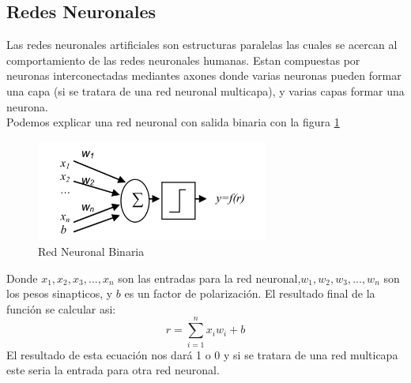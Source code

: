 \documentclass[conference]{IEEEtran}
\begin{document}
 \subsection{Redes Neuronales}
 Las redes neuronales artificiales son estructuras paralelas las cuales se acercan al comportamiento de las redes neuronales humanas. Estan compuestas por neuronas  interconectadas mediantes axones donde varias neuronas pueden formar una capa (si se tratara de una red neuronal multicapa), y varias capas formar una neurona.\\
 Podemos explicar una red neuronal con salida binaria con la figura \ref{fig_img4}\\
 \begin{figure}
\centering
\includegraphics[width=3.0in]{imagen4.pdf}

\caption{Red Neuronal Binaria}
\label{fig_img4}
\end{figure}

Donde $x_1,x_2,x_3,...,x_n$ son las entradas para la red neuronal,$w_1,w_2,w_3,...,w_n$  son los pesos sinapticos, y $b$ es un factor de polarizaci\'on. El resultado final de la funci\'on se calcular asi: 
\begin{equation}
r= \sum_{i=1}^{n}x_iw_i+b
\end{equation}
El resultado de esta ecuaci\'on  nos dar\'a 1 o 0 y si se tratara de una red multicapa este seria la entrada para otra red neuronal.\cite{art_red1}
\end{document}
